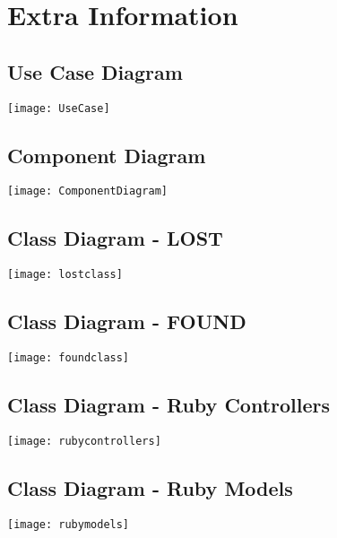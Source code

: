 \chapter{Extra Information}
\section{Use Case Diagram} \label{UseCase}
\texttt{[image: UseCase]}

\newpage

\section{Component Diagram}
\texttt{[image: ComponentDiagram]}

\newpage
\section{Class Diagram - LOST}
\texttt{[image: lostclass]}

\newpage
\section{Class Diagram - FOUND}
\texttt{[image: foundclass]}

\newpage
\section{Class Diagram - Ruby Controllers}
\texttt{[image: rubycontrollers]}

\section{Class Diagram - Ruby Models}
\texttt{[image: rubymodels]}